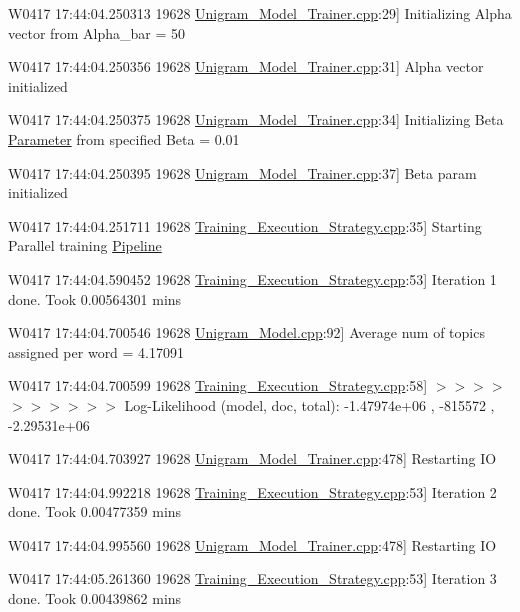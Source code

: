 {\ttfamily W0417 17:44:04.250313 19628 \hyperlink{_unigram___model___trainer_8cpp}{Unigram\_\-Model\_\-Trainer.cpp}:29\mbox{]} Initializing Alpha vector from Alpha\_\-bar = 50  }

{\ttfamily W0417 17:44:04.250356 19628 \hyperlink{_unigram___model___trainer_8cpp}{Unigram\_\-Model\_\-Trainer.cpp}:31\mbox{]} Alpha vector initialized  }

{\ttfamily W0417 17:44:04.250375 19628 \hyperlink{_unigram___model___trainer_8cpp}{Unigram\_\-Model\_\-Trainer.cpp}:34\mbox{]} Initializing Beta \hyperlink{struct_parameter}{Parameter} from specified Beta = 0.01  }

{\ttfamily W0417 17:44:04.250395 19628 \hyperlink{_unigram___model___trainer_8cpp}{Unigram\_\-Model\_\-Trainer.cpp}:37\mbox{]} Beta param initialized  }

{\ttfamily W0417 17:44:04.251711 19628 \hyperlink{_training___execution___strategy_8cpp}{Training\_\-Execution\_\-Strategy.cpp}:35\mbox{]} Starting Parallel training \hyperlink{class_pipeline}{Pipeline}  }

{\ttfamily W0417 17:44:04.590452 19628 \hyperlink{_training___execution___strategy_8cpp}{Training\_\-Execution\_\-Strategy.cpp}:53\mbox{]} Iteration 1 done. Took 0.00564301 mins  }

{\ttfamily W0417 17:44:04.700546 19628 \hyperlink{_unigram___model_8cpp}{Unigram\_\-Model.cpp}:92\mbox{]} Average num of topics assigned per word = 4.17091  }

{\ttfamily W0417 17:44:04.700599 19628 \hyperlink{_training___execution___strategy_8cpp}{Training\_\-Execution\_\-Strategy.cpp}:58\mbox{]} $>$$>$$>$$>$$>$$>$$>$$>$$>$$>$ Log-\/Likelihood (model, doc, total): -\/1.47974e+06 , -\/815572 , -\/2.29531e+06  }

{\ttfamily W0417 17:44:04.703927 19628 \hyperlink{_unigram___model___trainer_8cpp}{Unigram\_\-Model\_\-Trainer.cpp}:478\mbox{]} Restarting IO  }

{\ttfamily W0417 17:44:04.992218 19628 \hyperlink{_training___execution___strategy_8cpp}{Training\_\-Execution\_\-Strategy.cpp}:53\mbox{]} Iteration 2 done. Took 0.00477359 mins  }

{\ttfamily W0417 17:44:04.995560 19628 \hyperlink{_unigram___model___trainer_8cpp}{Unigram\_\-Model\_\-Trainer.cpp}:478\mbox{]} Restarting IO  }

{\ttfamily W0417 17:44:05.261360 19628 \hyperlink{_training___execution___strategy_8cpp}{Training\_\-Execution\_\-Strategy.cpp}:53\mbox{]} Iteration 3 done. Took 0.00439862 mins  }

